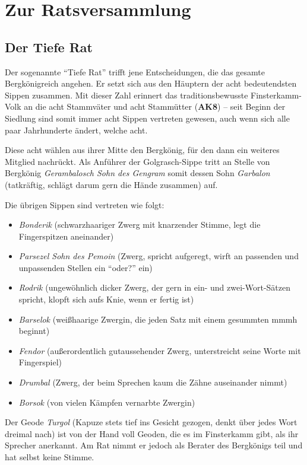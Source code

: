 \documentclass[openright]{Ilaris}
\newcommand{\fkv}{Finsterkamm-Volk }
\begin{document}
\section{Zur Ratsversammlung}
\subsection{Der Tiefe Rat}
Der sogenannte \enquote{Tiefe Rat} trifft jene Entscheidungen, die das  gesamte Bergkönigreich angehen.
Er setzt sich aus den Häuptern der acht bedeutendsten Sippen zusammen.
Mit dieser Zahl erinnert das traditionsbewusste \fkv an die acht Stammväter und acht Stammütter (\textbf{AK8}) --
seit Beginn der Siedlung sind somit immer acht Sippen vertreten gewesen, auch wenn sich alle paar Jahrhunderte ändert, welche acht.


Diese acht wählen aus ihrer Mitte den Bergkönig, für den dann ein weiteres Mitglied nachrückt.
Als Anführer der Golgrasch-Sippe tritt an Stelle von Bergkönig \emph{Gerambalosch Sohn des Gengram} somit dessen Sohn
\emph{Garbalon} (tatkräftig, schlägt darum gern die Hände zusammen) auf.

Die übrigen Sippen sind vertreten wie folgt:
\begin{itemize}
\item \emph{Bonderik} (schwarzhaariger Zwerg mit knarzender Stimme, legt die Fingerspitzen aneinander)
\item \emph{Parsezel Sohn des Pemoin} (Zwerg, spricht aufgeregt, wirft an passenden und unpassenden Stellen ein \enquote{oder?} ein)
\item \emph{Rodrik} (ungewöhnlich dicker Zwerg, der gern in ein- und zwei-Wort-Sätzen spricht, klopft sich aufs Knie, wenn er fertig ist)
\item \emph{Barselok} (weißhaarige Zwergin, die jeden Satz mit einem gesummten mmmh beginnt)
\item \emph{Fendor} (außerordentlich gutaussehender Zwerg, unterstreicht seine Worte mit Fingerspiel)
\item \emph{Drumbal} (Zwerg, der beim Sprechen kaum die Zähne auseinander nimmt)
\item \emph{Borsok}  (von vielen Kämpfen vernarbte Zwergin)
\end{itemize}

Der Geode \emph{Turgol} (Kapuze stets tief ins Gesicht gezogen, denkt über jedes Wort dreimal nach) ist von der Hand voll Geoden, die es im Finsterkamm gibt, als ihr Sprecher anerkannt.
Am Rat nimmt er jedoch als Berater des Bergkönigs teil und hat selbst keine Stimme.
\end{document}
